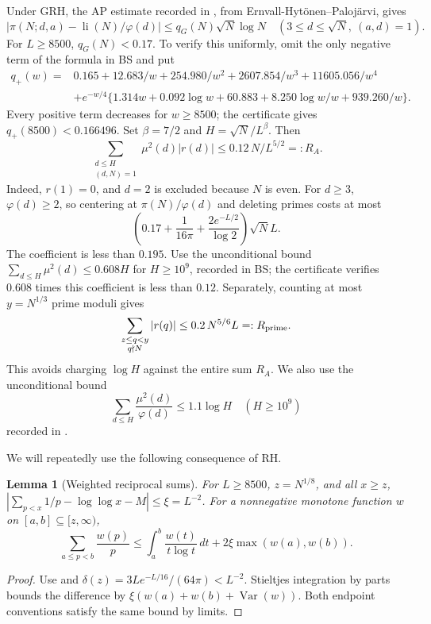 \documentclass[11pt]{article}
\newtheorem{lemma}[theorem]{Lemma}
\newcommand{\li}{\operatorname{li}}
\begin{document}
Under GRH, the AP estimate recorded in \cite[Section 2]{BS}, from
Ernvall-Hyt\"onen--Paloj\"arvi, gives
\[
|\pi(N;d,a)-\li(N)/\varphi(d)|\le q_G(N)\sqrt N\log N
\quad(3\le d\le\sqrt N,\ (a,d)=1).
\]
For $L\ge8500$, $q_G(N)<0.17$. To verify this uniformly, omit the
only negative term of the formula in BS and put
\begin{align*}
q_+(w)={}&0.165+12.683/w+254.980/w^2+2607.854/w^3+11605.056/w^4\\
&+e^{-w/4}\{1.314w+0.092\log w+60.883
+8.250\log w/w+939.260/w\}.
\end{align*}
Every positive term decreases for $w\ge8500$; the certificate gives
$q_+(8500)<0.166496$. Set $\beta=7/2$ and
$H=\sqrt N/L^\beta$. Then
\begin{equation}\label{eq:R}
\sum_{\substack{d\le H\\(d,N)=1}}\mu^2(d)|r(d)|
\le0.12\,N/L^{5/2}=:R_A.
\end{equation}
Indeed, $r(1)=0$, and $d=2$ is excluded because $N$ is even. For
$d\ge3$, $\varphi(d)\ge2$, so centering at $\pi(N)/\varphi(d)$
and deleting primes costs at most
\[
\left(0.17+\frac1{16\pi}+\frac{2e^{-L/2}}{\log2}\right)\sqrt N L.
\]
The coefficient is less than $0.195$. Use the unconditional bound
$\sum_{d\le H}\mu^2(d)\le0.608H$ for $H\ge10^9$, recorded in
BS; the certificate verifies $0.608$ times this coefficient is less
than $0.12$. Separately, counting at most $y=N^{1/3}$ prime moduli gives
\begin{equation}\label{eq:Rprime}
\sum_{\substack{z\le q<y\\q\nmid N}}|r(q)|
\le0.2\,N^{5/6}L=:R_{\rm prime}.
\end{equation}
This avoids charging $\log H$ against the entire sum $R_A$.
We also use the unconditional bound
\begin{equation}\label{eq:phimu}
\sum_{d\le H}\frac{\mu^2(d)}{\varphi(d)}\le1.1\log H\quad(H\ge10^9)
\end{equation}
recorded in \cite[Section 2]{BS}.

We will repeatedly use the following consequence of RH.
\begin{lemma}[Weighted reciprocal sums]\label{lem:weighted}
For $L\ge8500$, $z=N^{1/8}$, and all $x\ge z$,
$|\sum_{p<x}1/p-\log\log x-M|\le\xi=L^{-2}$.
For a nonnegative monotone function $w$ on $[a,b]\subseteq[z,\infty)$,
\[
\sum_{a\le p<b}\frac{w(p)}p
\le\int_a^b\frac{w(t)}{t\log t}\,dt+2\xi\max(w(a),w(b)).
\]
\end{lemma}
\begin{proof}
Use \cite[Corollary 1.3]{LN} and
$\delta(z)=3Le^{-L/16}/(64\pi)<L^{-2}$. Stieltjes integration
by parts bounds the difference by
$\xi(w(a)+w(b)+\operatorname{Var}(w))$.
Both endpoint conventions satisfy the same bound by limits.
\end{proof}
\end{document}
